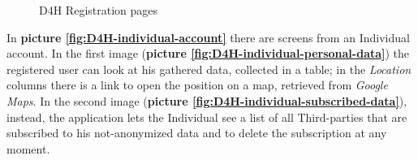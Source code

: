 \begin{figure}[H]
  \centering
  
  \caption{D4H Registration pages}
  \label{fig:D4H-registration}
\end{figure}

In \textbf{picture \ref{fig:D4H-individual-account}} there are screens from an Individual account. In the first image (\textbf{picture \ref{fig:D4H-individual-personal-data}}) the registered user can look at his gathered data, collected in a table; in the \emph{Location} columns there is a link to open the position on a map, retrieved from \emph{Google Maps}. In the second image (\textbf{picture \ref{fig:D4H-individual-subscribed-data}}), instead, the application lets the Individual see a list of all Third-parties that are subscribed to his not-anonymized data and to delete the subscription at any moment.

